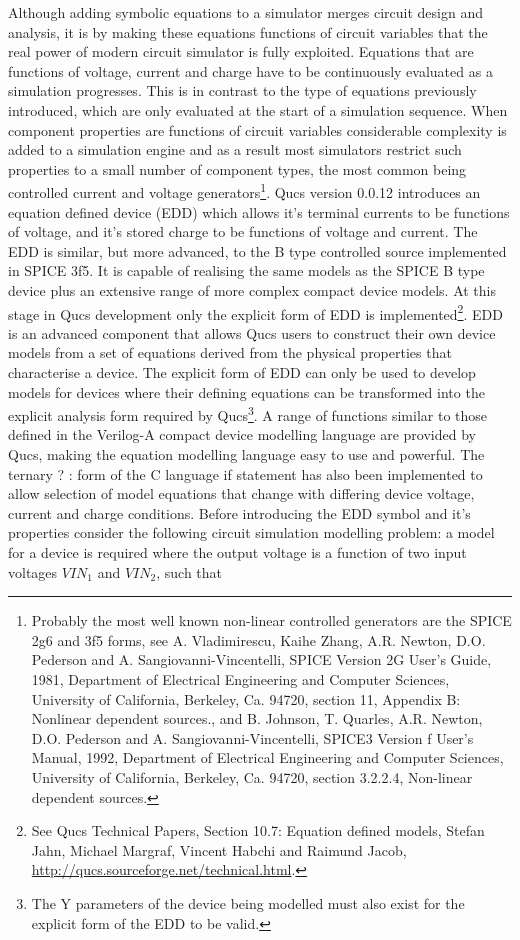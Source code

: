 Although adding symbolic equations to a simulator merges circuit
design and analysis, it is by making these equations functions of
circuit variables that the real power of modern circuit simulator is
fully exploited. Equations that are functions of voltage, current and
charge have to be continuously evaluated as a simulation
progresses. This is in contrast to the type of equations previously
introduced, which are only evaluated at the start of a simulation
sequence.  When component properties are functions of circuit
variables considerable complexity is added to a simulation engine and
as a result most simulators restrict such properties to a small number
of component types, the most common being controlled current and
voltage generators\footnote{Probably the most well known non-linear
controlled generators are the SPICE 2g6 and 3f5 forms, see
A. Vladimirescu, Kaihe Zhang, A.R. Newton, D.O. Pederson and
A. Sangiovanni-Vincentelli, SPICE Version 2G User's Guide, 1981,
Department of Electrical Engineering and Computer Sciences, University
of California, Berkeley, Ca. 94720, section 11, Appendix B: Nonlinear
dependent sources., and B. Johnson, T. Quarles, A.R. Newton,
D.O. Pederson and A. Sangiovanni-Vincentelli, SPICE3 Version f User's
Manual, 1992, Department of Electrical Engineering and Computer
Sciences, University of California, Berkeley, Ca. 94720, section
3.2.2.4, Non-linear dependent sources.}. Qucs version 0.0.12
introduces an equation defined device (EDD) which allows it's terminal
currents to be functions of voltage, and it's stored charge to be
functions of voltage and current. The EDD is similar, but more
advanced, to the B type controlled source implemented in SPICE 3f5. It
is capable of realising the same models as the SPICE B type device
plus an extensive range of more complex compact device models. At this
stage in Qucs development only the explicit form of EDD is
implemented\footnote{See Qucs Technical Papers, Section 10.7: Equation
defined models, Stefan Jahn, Michael Margraf, Vincent Habchi and
Raimund Jacob, \url{http://qucs.sourceforge.net/technical.html}.}. EDD
is an advanced component that allows Qucs users to construct their own
device models from a set of equations derived from the physical
properties that characterise a device. The explicit form of EDD can
only be used to develop models for devices where their defining
equations can be transformed into the explicit analysis form required
by Qucs\footnote{The Y parameters of the device being modelled must
also exist for the explicit form of the EDD to be valid.}. A range of
functions similar to those defined in the Verilog-A compact device
modelling language are provided by Qucs, making the equation modelling
language easy to use and powerful. The ternary ? : form of the C
language if statement has also been implemented to allow selection of
model equations that change with differing device voltage, current and
charge conditions.  Before introducing the EDD symbol and it's
properties consider the following circuit simulation modelling
problem: a model for a device is required where the output voltage is
a function of two input voltages $VIN_1$ and $VIN_2$, such that


